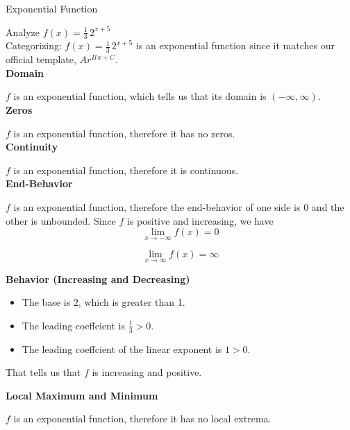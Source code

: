 \documentclass{ximera}
\begin{document}
\begin{example}  Exponential Function



Analyze   $f(x) = \frac{1}{3} \, 2^{x+5}$ \\





Categorizing: $f(x) = \frac{1}{3} \, 2^{x+5}$ is an exponential function since it matches our official template, $A r^{B \, x + C}$. \\


\textbf{Domain}

$f$ is an exponential function, which tells us that its domain is $(-\infty, \infty)$. \\


\textbf{Zeros}

$f$ is an exponential function, therefore it has no zeros. \\


\textbf{Continuity}

$f$ is an exponential function, therefore it is continuous. \\



\textbf{End-Behavior}

$f$ is an exponential function, therefore the end-behavior of one side is $0$ and the other is unbounded. Since $f$ is positive and increasing, we have \\


\[ \lim\limits_{x \to -\infty} f(x) = 0 \]

\[ \lim\limits_{x \to \infty} f(x) = \infty\]





\textbf{Behavior (Increasing and Decreasing)}


\begin{itemize}
\item The base is $2$, which is greater than 1.
\item The leading coeffcient is $\frac{1}{3} > 0$.
\item The leading coeffcient of the linear exponent is $1 > 0$.
\end{itemize}

That tells us that $f$ is increasing and positive.





\textbf{Local Maximum and Minimum}

$f$ is an exponential function, therefore it has no local extrema. \\






\end{example}
\end{document}
